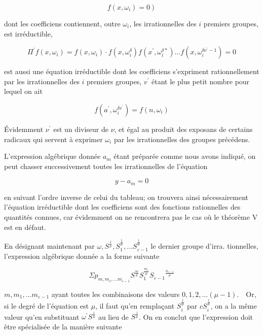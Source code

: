 \documentclass{article}
\begin{document}
\[
\left.f\left(x, \omega_{i}\right)=0\right)
\]

dont les coefficiens contiennent, outre \(\omega_{i}\), les irrationnelles des \(i\) premiers groupes, est irréductible,

\[
\Pi^{\prime} f\left(x, \omega_{i}\right)=f\left(x, \omega_{i}\right) \cdot f\left(x, \omega_{i}^{\delta}\right) f\left(x^{\prime}, \omega_{i}^{\delta *}\right) \ldots f\left(x, \omega_{i}^{\delta \nu^{\prime}-1}\right)=0
\]

est aussi une équation irréductible dont les coefficiens s'expriment rationnellement par les irrationnelles des \(i\) premiers groupes, \(v^{\prime}\) étant le plus petit nombre pour lequel on ait

\[
f\left(a^{\prime}, \omega_{i}^{\delta v^{\prime}}\right)=f\left(n, \omega_{i}\right)
\]

Évidemment \(\nu^{\prime}\) est un diviseur de \(\nu\), et égal au produit des exposans de certains radicaux qui servent à exprimer \(\omega_{i}\) par les irrationnelles des groupes précédens.

L'expression algébrique donnée \(a_{m}\) étant préparée comme nous avons indiqué, on peut chasser successivement toutes les irrationnelles de l'équation

\[
y-a_{m}=0
\]

en suivant l'ordre inverse de celui du tableau; on trouvera ainsi nécessairement l'équation irréductible dont les coefficiens sont des fonctions rationnelles des quantités connues, car évidemment on ne rencontrera pas le cas où le théorème \(\mathrm{V}\) est en défaut.

En désignant maintenant par \(\omega, S^{\frac{1}{\mu}}, S_{1}^{\frac{1}{\mu}}, \ldots S_{\varepsilon-1}^{\frac{1}{\mu}}\) le dernier groupe d'irra. tionnelles, l'expression algébrique donnée a la forme suivante

\[
\Sigma p_{m, m_{1}, \ldots m_{\varepsilon-1}} S^{\frac{m}{\mu}} S_{1}^{\frac{m_{1}}{\mu}} S_{\varepsilon-1}{ }^{\frac{n_{\varepsilon-1}}{\mu}}
\]

\(m, m_{1}, \ldots m_{\varepsilon-1}\) ayant toutes les combinaisons des valeurs \(0,1,2, \ldots(\mu-1) . \quad \mathrm{Or}\), si le degré de l'équation est \(\mu\), il faut qu'en remplaçant \(S_{i}^{\frac{1}{\mu}}\) par \(c S_{i}^{\frac{1}{\mu}}\), on a la même valeur qu'en substituant \(\omega^{\prime} S^{\frac{1}{\mu}}\) au lieu de \(S^{\frac{1}{\mu}}\). On en conclut que l'expression doit être spécialisée de la manière suivante
\end{document}
